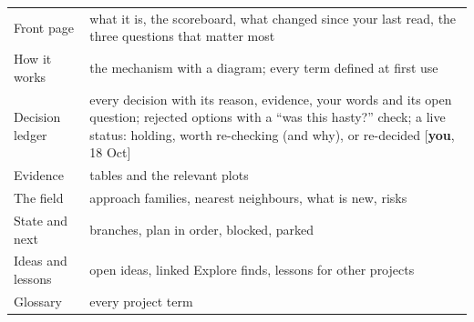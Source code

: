 \documentclass[10pt]{extarticle}
\newcommand{\youx}[1]{{\small[\textbf{you}, #1]}}
\begin{document}
\begin{tabularx}{\linewidth}{@{}l Y@{}}
\toprule
Front page & what it is, the scoreboard, what changed since your last read, the three questions that matter most \\
How it works & the mechanism with a diagram; every term defined at first use \\
Decision ledger & every decision with its reason, evidence, your words and its open question; rejected options with a ``was this hasty?'' check; a live status: holding, worth re-checking (and why), or re-decided \youx{18 Oct} \\
Evidence & tables and the relevant plots \\
The field & approach families, nearest neighbours, what is new, risks \\
State and next & branches, plan in order, blocked, parked \\
Ideas and lessons & open ideas, linked Explore finds, lessons for other projects \\
Glossary & every project term \\
\bottomrule
\end{tabularx}
\end{document}
